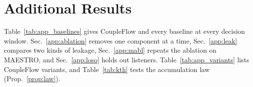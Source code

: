 \documentclass[10pt,twocolumn,letterpaper]{article}
\begin{document}
\section{Additional Results}\label{app:results}
Table~\ref{tab:app_baselines} gives CoupleFlow and every baseline at every decision window.
Sec.~\ref{app:ablation} removes one component at a time, Sec.~\ref{app:leak} compares two
kinds of leakage, Sec.~\ref{app:mabl} repeats the ablation on MAESTRO, and
Sec.~\ref{app:loso} holds out listeners. Table~\ref{tab:app_variants} lists CoupleFlow
variants, and Table~\ref{tab:kth} tests the accumulation law (Prop.~\ref{prop:law}).
\begin{table}[h]\centering\small
\caption{CoupleFlow and every baseline at every window (\%, content-disjoint folds, pooled over
all test windows; competing talker for two-talker sets, match--mismatch for SparrKULee and
MEG-MASC). CoupleFlow: mean of 3 seeds with the validation-chosen lag window, as in
Table~\ref{tab:main}; ``CoupleFlow, mm'': match--mismatch on the two-talker recordings. trial:
one decision per trial. ``--'': window longer than the trials. CoupleFlow nulls:
\nullShortMin--\nullShortMax\% up to 10\,s; \nullLongMin--\nullLongMax\% at 20--60\,s, where
few windows exist. DECAF, trained with the same folds and selection rule, stays near chance on the
two-talker sets.}
\label{tab:app_baselines}

\end{table}

\FloatBarrier
\end{document}
